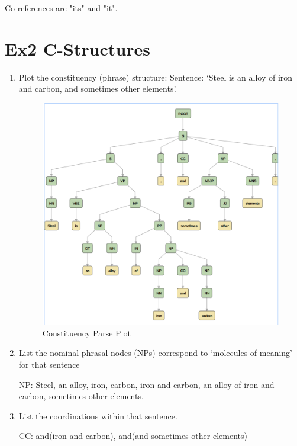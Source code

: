 \documentclass[12pt]{article}
\begin{document}
{\begin{enumerate}[1.]
	Co-references are "its" and "it".

\end{enumerate}

\newpage
\section{Ex2 C-Structures}
\label{sec: ex2}
\begin{enumerate}[1.]
	\item Plot the constituency (phrase) structure: 
		Sentence: ‘Steel is an alloy of iron and carbon, and sometimes other elements’.
		\begin{figure}[ht]
			\centering
			\includegraphics[scale=0.3]{figs/constituency_parse.png}
			\caption{Constituency Parse Plot}
			\label{fig:label}
		\end{figure}
	\item List the nominal phrasal nodes (NPs) correspond to ‘molecules of meaning’ for that sentence

		NP: Steel, an alloy, iron, carbon, iron and carbon, an alloy of iron and carbon, sometimes other elements.
	\item List the coordinations within that sentence.

		CC: and(iron and carbon), and(and sometimes other elements)
\end{enumerate}

\newpage
}
\end{document}
